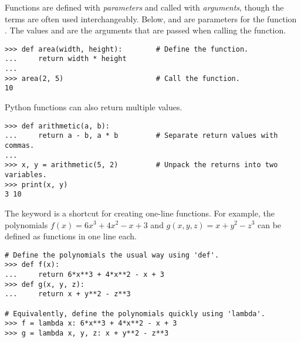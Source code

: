 Functions are defined with \emph{parameters} and called with \emph{arguments}, though the terms are often used interchangeably.
Below,  and  are parameters for the function .
The values  and  are the arguments that are passed when calling the function.

\begin{lstlisting}
>>> def area(width, height):        # Define the function.
...     return width * height
...
>>> area(2, 5)                      # Call the function.
10
\end{lstlisting}

Python functions can also return multiple values.

\begin{lstlisting}
>>> def arithmetic(a, b):
...     return a - b, a * b         # Separate return values with commas.
...
>>> x, y = arithmetic(5, 2)         # Unpack the returns into two variables.
>>> print(x, y)
3 10
\end{lstlisting}

The keyword  is a shortcut for creating one-line functions.
For example, the polynomials $f(x) = 6x^3 + 4x^2 - x + 3$ and $g(x,y,z) = x + y^2 - z^3$ can be defined as functions in one line each.

\begin{lstlisting}
# Define the polynomials the usual way using 'def'.
>>> def f(x):
...     return 6*x**3 + 4*x**2 - x + 3
>>> def g(x, y, z):
...     return x + y**2 - z**3

# Equivalently, define the polynomials quickly using 'lambda'.
>>> f = lambda x: 6*x**3 + 4*x**2 - x + 3
>>> g = lambda x, y, z: x + y**2 - z**3
\end{lstlisting}

